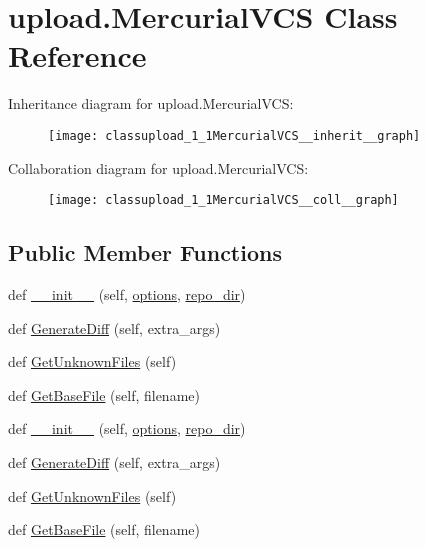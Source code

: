 \hypertarget{classupload_1_1MercurialVCS}{}\section{upload.\+Mercurial\+V\+CS Class Reference}
\label{classupload_1_1MercurialVCS}


Inheritance diagram for upload.\+Mercurial\+V\+CS\+:\nopagebreak
\begin{figure}[H]
\begin{center}
\leavevmode
\texttt{[image: classupload\_1\_1MercurialVCS\_\_inherit\_\_graph]}
\end{center}
\end{figure}


Collaboration diagram for upload.\+Mercurial\+V\+CS\+:\nopagebreak
\begin{figure}[H]
\begin{center}
\leavevmode
\texttt{[image: classupload\_1\_1MercurialVCS\_\_coll\_\_graph]}
\end{center}
\end{figure}
\subsection*{Public Member Functions}
\begin{DoxyCompactItemize}
\item 
def \hyperlink{classupload_1_1MercurialVCS_a33890f442dedbb7d9fd45c08b5baed56}{\+\_\+\+\_\+init\+\_\+\+\_\+} (self, \hyperlink{classupload_1_1VersionControlSystem_a4d57d043bc408887b94269fe4cea9556}{options}, \hyperlink{classupload_1_1MercurialVCS_a219c1e0ab9ce864e3231913762ea489b}{repo\+\_\+dir})
\item 
def \hyperlink{classupload_1_1MercurialVCS_a6c05746012d8cd435c94ace1465671ef}{Generate\+Diff} (self, extra\+\_\+args)
\item 
def \hyperlink{classupload_1_1MercurialVCS_a6190899fb86cd09ad84cc5d4b0ebd2f3}{Get\+Unknown\+Files} (self)
\item 
def \hyperlink{classupload_1_1MercurialVCS_a0cdc0cbe6ac4daab82f5f01e6ae2e670}{Get\+Base\+File} (self, filename)
\item 
def \hyperlink{classupload_1_1MercurialVCS_a33890f442dedbb7d9fd45c08b5baed56}{\+\_\+\+\_\+init\+\_\+\+\_\+} (self, \hyperlink{classupload_1_1VersionControlSystem_a4d57d043bc408887b94269fe4cea9556}{options}, \hyperlink{classupload_1_1MercurialVCS_a219c1e0ab9ce864e3231913762ea489b}{repo\+\_\+dir})
\item 
def \hyperlink{classupload_1_1MercurialVCS_a6c05746012d8cd435c94ace1465671ef}{Generate\+Diff} (self, extra\+\_\+args)
\item 
def \hyperlink{classupload_1_1MercurialVCS_a6190899fb86cd09ad84cc5d4b0ebd2f3}{Get\+Unknown\+Files} (self)
\item 
def \hyperlink{classupload_1_1MercurialVCS_a0cdc0cbe6ac4daab82f5f01e6ae2e670}{Get\+Base\+File} (self, filename)
\end{DoxyCompactItemize}
